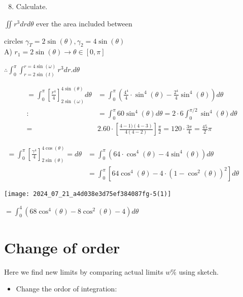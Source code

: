 \documentclass[12pt, a4paper]{article}
\begin{document}
\begin{enumerate}
  \setcounter{enumi}{7}
  \item Calculate.
\end{enumerate}

$\iint r^{3} d r d \theta$ ever the area included between

circles $\gamma_{T}=2 \sin (\theta), \gamma_{2}=4 \sin (\theta)$\\
A) $r_{1}=2 \sin (\theta) \rightarrow \theta \in[0, \pi]$

$\therefore \int_{0}^{\pi} \int_{r=2 \sin (t)}^{r=4 \sin (\omega)} r^{3} d r . d \theta$

$$
\begin{aligned}
=\int_{0}^{\pi}\left[\frac{r^{4}}{4}\right]_{2 \sin (\omega)}^{4 \sin (\theta)} d \theta & =\int_{0}^{\pi}\left(\frac{4^{4}}{4} \cdot \sin ^{4}(\theta)-\frac{2^{4}}{4} \sin ^{4}(\theta)\right) d \theta \\
: & =\int_{0}^{\pi} 60 \sin ^{4}(\theta) d \theta=2 \cdot 6 \int_{0}^{\pi / 2} \sin ^{4}(\theta) d \theta \\
= & 2.60 \cdot\left[\frac{4-1)(4-3)}{4(4-2)}\right] \frac{\pi}{2}=120 \cdot \frac{3 \pi}{4}=\frac{45}{2} \pi
\end{aligned}
$$

$\begin{aligned}=\int_{0}^{\pi}\left[\frac{\gamma^{4}}{4}\right]_{2 \sin (\theta)}^{4 \cos (\theta)}=d \theta & =\int_{0}^{\pi}\left(64 \cdot \cos ^{4}(\theta)-4 \sin ^{4}(\theta)\right) d \theta \\ & =\int_{0}^{\pi}\left[64 \cos ^{4}(\theta)-4 \cdot\left(1-\cos ^{2}(\theta)\right)^{2}\right] d \theta\end{aligned}$

\begin{center}
\texttt{[image: 2024\_07\_21\_a4d038e3d75ef384087fg-5(1)]}
\end{center}

$=\int_{0}^{4}\left(68 \cos ^{4}(\theta)-8 \cos ^{2}(\theta)-4\right) d \theta$

\section*{Change of order}
Here we find new limits by comparing actual limits $w \%$ using sketch.

\begin{itemize}
  \item Change the ordor of integration:
\end{itemize}
\end{document}
